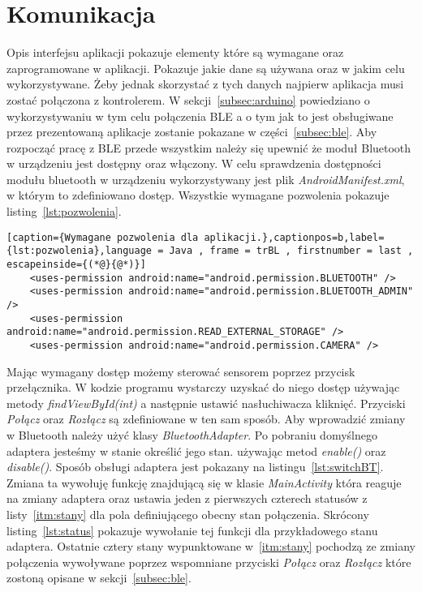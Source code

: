 \section{Komunikacja}
\label{sec:komunikacja}
Opis interfejsu aplikacji pokazuje elementy które są wymagane oraz zaprogramowane w aplikacji. Pokazuje jakie dane są używana oraz w jakim celu wykorzystywane. Żeby jednak skorzystać z tych danych najpierw aplikacja musi zostać połączona z kontrolerem. W sekcji~\ref{subsec:arduino} powiedziano o wykorzystywaniu w tym celu połączenia BLE a o tym jak to jest obsługiwane przez prezentowaną aplikacje zostanie pokazane w części~\ref{subsec:ble}. Aby rozpocząć pracę z BLE przede wszystkim należy się upewnić że moduł Bluetooth w urządzeniu jest dostępny oraz włączony. W celu sprawdzenia dostępności modułu bluetooth w urządzeniu wykorzystywany jest plik \textit{AndroidManifest.xml}, w którym to zdefiniowano dostęp. Wszystkie wymagane pozwolenia pokazuje listing~\ref{lst:pozwolenia}.
	\begin{lstlisting}[caption={Wymagane pozwolenia dla aplikacji.},captionpos=b,label={lst:pozwolenia},language = Java , frame = trBL , firstnumber = last , escapeinside={(*@}{@*)}]
    <uses-permission android:name="android.permission.BLUETOOTH" />
    <uses-permission android:name="android.permission.BLUETOOTH_ADMIN" />
    <uses-permission android:name="android.permission.READ_EXTERNAL_STORAGE" />
    <uses-permission android:name="android.permission.CAMERA" />
\end{lstlisting}
Mając wymagany dostęp możemy sterować sensorem poprzez przycisk przełącznika. W kodzie programu wystarczy uzyskać do niego dostęp używając metody \textit{findViewById(int)} a następnie ustawić nasłuchiwacza kliknięć. Przyciski \textit{Połącz} oraz \textit{Rozłącz} są zdefiniowane w ten sam sposób. Aby wprowadzić zmiany w Bluetooth należy użyć klasy \textit{BluetoothAdapter}. Po pobraniu domyślnego adaptera jesteśmy w stanie określić jego stan. używając metod \textit{enable()} oraz \textit{disable()}. Sposób obsługi adaptera jest pokazany na listingu~\ref{lst:switchBT}. Zmiana ta wywołuję funkcję znajdującą się w klasie \textit{MainActivity} która reaguje na zmiany adaptera oraz ustawia jeden z pierwszych czterech statusów z listy~\ref{itm:stany} dla pola definiującego obecny stan połączenia. Skrócony listing~\ref{lst:status} pokazuje wywołanie tej funkcji dla przykładowego stanu adaptera. Ostatnie cztery stany wypunktowane w~\ref{itm:stany} pochodzą ze zmiany połączenia wywoływane poprzez wspomniane przyciski \textit{Połącz} oraz \textit{Rozłącz} które zostoną opisane w sekcji~\ref{subsec:ble}. \newpage

